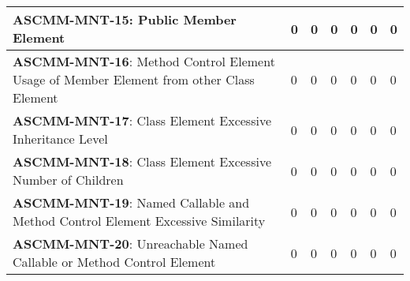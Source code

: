 \documentclass[openany,10pt,a4paper]{article}
\begin{document}
\begin{table}[h]
\begin{tabular}{|p{3in}|p{0.3in}|p{0.3in}|p{0.3in}|p{0.3in}|p{0.3in}|p{0.4in}|}
\textbf{ASCMM-MNT-15}: Public Member Element & 0 & 0 & 0 & 0 & 0 & 0 \\ \hline
\textbf{ASCMM-MNT-16}: Method Control Element Usage of Member Element from other Class Element & 0 & 0 & 0 & 0 & 0 & 0 \\ \hline
\textbf{ASCMM-MNT-17}: Class Element Excessive Inheritance Level & 0 & 0 & 0 & 0 & 0 & 0 \\ \hline
\textbf{ASCMM-MNT-18}: Class Element Excessive Number of Children & 0 & 0 & 0 & 0 & 0 & 0 \\ \hline
\textbf{ASCMM-MNT-19}: Named Callable and Method Control Element Excessive Similarity & 0 & 0 & 0 & 0 & 0 & 0 \\ \hline
\textbf{ASCMM-MNT-20}: Unreachable Named Callable or Method Control Element & 0 & 0 & 0 & 0 & 0 & 0 \\ \hline
	\end{tabular} 
	\label{tab:tabela1}
\end{table}
\end{document}
